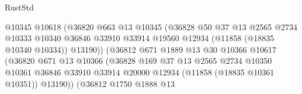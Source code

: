\begin{lexlean}{RustStd}
\begin{coremodule}
                                        @10345
                                        @10618
                                        (@36820
                                          @663
                                          @13
                                          @10345
                                          (@36828
                                            @50
                                            @37
                                            @13
                                            @2565
                                            @2734
                                            @10333
                                            @10340
                                            @36846
                                            @33910
                                            @33914
                                            @19560
                                            @12934
                                            (@11858 (@18835 @10340 @10334))
                                            @13190))
                                        (@36812
                                          @671
                                          @1889
                                          @13
                                          @30
                                          @10366
                                          @10617
                                          (@36820
                                            @671
                                            @13
                                            @10366
                                            (@36828
                                              @169
                                              @37
                                              @13
                                              @2565
                                              @2734
                                              @10350
                                              @10361
                                              @36846
                                              @33910
                                              @33914
                                              @20000
                                              @12934
                                              (@11858 (@18835 @10361 @10351))
                                              @13190))
                                          (@36812
                                            @1750
                                            @1888
                                            @13

\end{coremodule}
\end{lexlean}
